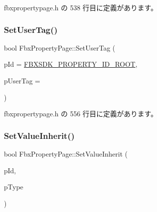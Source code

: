  fbxpropertypage.\+h の 538 行目に定義があります。

\mbox{\label{class_fbx_property_page_aa0283d7109116caafaac33e20013835e}} 
\subsubsection{\texorpdfstring{Set\+User\+Tag()}{SetUserTag()}}
{\footnotesize\ttfamily bool Fbx\+Property\+Page\+::\+Set\+User\+Tag (\begin{DoxyParamCaption}\item[{\hyperlink{fbxtypes_8h_a088fa96de3b0b3ea69f0f6afef525dfb}{Fbx\+Int}}]{p\+Id = {\ttfamily \hyperlink{fbxpropertydef_8h_a291bdb6d8428dce8463143fa3aba2c34}{F\+B\+X\+S\+D\+K\+\_\+\+P\+R\+O\+P\+E\+R\+T\+Y\+\_\+\+I\+D\+\_\+\+R\+O\+OT}},  }\item[{int}]{p\+User\+Tag = {} }\end{DoxyParamCaption})\hspace{0.3cm}{\ttfamily [inline]}}



 fbxpropertypage.\+h の 556 行目に定義があります。

\mbox{\label{class_fbx_property_page_a65b19fb72a27bd344e2ede296a3b1593}} 
\subsubsection{\texorpdfstring{Set\+Value\+Inherit()}{SetValueInherit()}}
{\footnotesize\ttfamily bool Fbx\+Property\+Page\+::\+Set\+Value\+Inherit (\begin{DoxyParamCaption}\item[{\hyperlink{fbxtypes_8h_a088fa96de3b0b3ea69f0f6afef525dfb}{Fbx\+Int}}]{p\+Id,  }\item[{\hyperlink{class_fbx_property_flags_ae3b667a4fcac4b827fa186a698fec2f8}{Fbx\+Property\+Flags\+::\+E\+Inherit\+Type}}]{p\+Type }\end{DoxyParamCaption})\hspace{0.3cm}{\ttfamily [inline]}}



